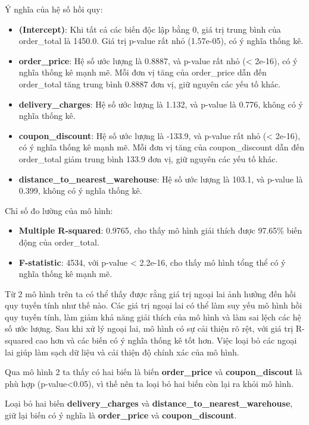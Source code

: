 Ý nghĩa của hệ số hồi quy:
\begin{itemize}
\item\textbf{(Intercept)}: Khi tất cả các biến độc lập bằng 0, giá trị trung bình của order\_total là 1450.0. Giá trị p-value rất nhỏ (1.57e-05), có ý nghĩa thống kê.
\item\textbf{order\_price}: Hệ số ước lượng là 0.8887, và p-value rất nhỏ (< 2e-16), có ý nghĩa thống kê mạnh mẽ. Mỗi đơn vị tăng của order\_price dẫn đến order\_total tăng trung bình 0.8887 đơn vị, giữ nguyên các yếu tố khác.\\
\item\textbf{delivery\_charges}: Hệ số ước lượng là 1.132, và p-value là 0.776, không có ý nghĩa thống kê.
\item\textbf{coupon\_discount}: Hệ số ước lượng là -133.9, và p-value rất nhỏ (< 2e-16), có ý nghĩa thống kê mạnh mẽ. Mỗi đơn vị tăng của coupon\_discount dẫn đến order\_total giảm trung bình 133.9 đơn vị, giữ nguyên các yếu tố khác.
\item\textbf{distance\_to\_nearest\_warehouse}: Hệ số ước lượng là 103.1, và p-value là 0.399, không có ý nghĩa thống kê.
\end{itemize}

Chỉ số đo lường của mô hình:

\begin{itemize}
\item\textbf{Multiple R-squared}: 0.9765, cho thấy mô hình giải thích được 97.65\% biến động của order\_total.
\item\textbf{F-statistic}: 4534, với p-value < 2.2e-16, cho thấy mô hình tổng thể có ý nghĩa thống kê mạnh mẽ.
\end{itemize}

Từ 2 mô hình trên ta có thể thấy được rằng giá trị ngoại lai ảnh hưởng đến hồi quy tuyến tính như thế nào. Các giá trị ngoại lai có thể làm suy yếu mô hình hồi quy tuyến tính, làm giảm khả năng giải thích của mô hình và làm sai lệch các hệ số ước lượng. Sau khi xử lý ngoại lai, mô hình có sự cải thiện rõ rệt, với giá trị R-squared cao hơn và các biến có ý nghĩa thống kê tốt hơn. Việc loại bỏ các ngoại lai giúp làm sạch dữ liệu và cải thiện độ chính xác của mô hình.

Qua mô hình 2 ta thấy có hai biến là biến \textbf{order\_price} và \textbf{coupon\_discout} là phù hợp (p-value<0.05), vì thế nên ta loại bỏ hai biến còn lại ra khỏi mô hình.

Loại bỏ hai biến \textbf{delivery\_charges} và \textbf{distance\_to\_nearest\_warehouse}, giữ lại biến có ý nghĩa là \textbf{order\_price} và \textbf{coupon\_discount}.

